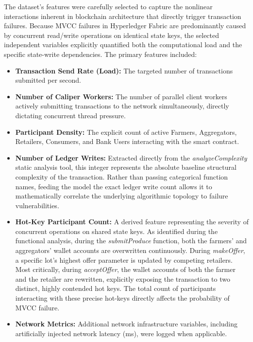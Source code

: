 \documentclass[manuscript,screen]{acmart}
\begin{document}
The dataset's features were carefully selected to capture the nonlinear interactions inherent in blockchain architecture that directly trigger transaction failures. Because MVCC failures in Hyperledger Fabric are predominantly caused by concurrent read/write operations on identical state keys, the selected independent variables explicitly quantified both the computational load and the specific state-write dependencies. The primary features included:
\begin{itemize}
    \item \textbf{Transaction Send Rate (Load):} The targeted number of transactions submitted per second.
    \item \textbf{Number of Caliper Workers:} The number of parallel client workers actively submitting transactions to the network simultaneously, directly dictating concurrent thread pressure.
    \item \textbf{Participant Density:} The explicit count of active Farmers, Aggregators, Retailers, Consumers, and Bank Users interacting with the smart contract.
    \item \textbf{Number of Ledger Writes:} Extracted directly from the \textit{analyzeComplexity} static analysis tool, this integer represents the absolute baseline structural complexity of the transaction. Rather than passing categorical function names, feeding the model the exact ledger write count allows it to mathematically correlate the underlying algorithmic topology to failure vulnerabilities.
    \item \textbf{Hot-Key Participant Count:} A derived feature representing the severity of concurrent operations on shared state keys. As identified during the functional analysis, during the \textit{submitProduce} function, both the farmers' and aggregators' wallet accounts are overwritten continuously. During \textit{makeOffer}, a specific lot's highest offer parameter is updated by competing retailers. Most critically, during \textit{acceptOffer}, the wallet accounts of both the farmer and the retailer are rewritten, explicitly exposing the transaction to two distinct, highly contended hot keys. The total count of participants interacting with these precise hot-keys directly affects the probability of MVCC failure.
    \item \textbf{Network Metrics:} Additional network infrastructure variables, including artificially injected network latency (ms), were logged when applicable.
\end{itemize}
\end{document}
